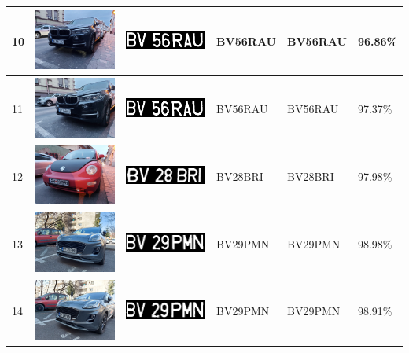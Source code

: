 \documentclass[a4paper,12pt]{report}
\begin{document}
\begin{longtable}{| m{0.6cm} | m{3cm} | m{3cm} | m{1.8cm} | m{1.8cm} | m{1.8cm} |}
        10 & \includegraphics[width=3cm,keepaspectratio]{dataset/4_d2.jpg} & \includegraphics[width=3cm,keepaspectratio]{segmentari/10.jpg} & BV56RAU & BV56RAU & 96.86\% \\ \hline
        11 & \includegraphics[width=3cm,keepaspectratio]{dataset/4_d3.jpg} & \includegraphics[width=3cm,keepaspectratio]{segmentari/11.jpg} & BV56RAU & BV56RAU & 97.37\% \\ \hline
        12 & \includegraphics[width=3cm,keepaspectratio]{dataset/5_d1.jpg} & \includegraphics[width=3cm,keepaspectratio]{segmentari/12.jpg} & BV28BRI & BV28BRI & 97.98\% \\ \hline
        13 & \includegraphics[width=3cm,keepaspectratio]{dataset/6_d1.jpg} & \includegraphics[width=3cm,keepaspectratio]{segmentari/13.jpg} & BV29PMN & BV29PMN & 98.98\% \\ \hline
        14 & \includegraphics[width=3cm,keepaspectratio]{dataset/6_d2.jpg} & \includegraphics[width=3cm,keepaspectratio]{segmentari/14.jpg} & BV29PMN & BV29PMN & 98.91\% \\ \hline

\end{longtable}
\end{document}

